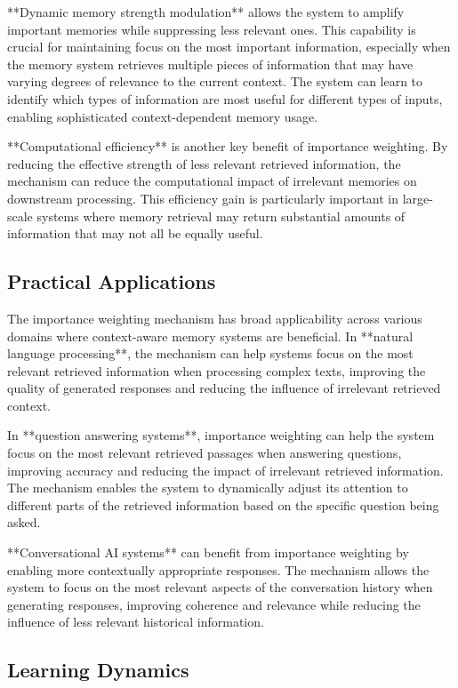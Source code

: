 \documentclass{article}
\begin{document}
**Dynamic memory strength modulation** allows the system to amplify important memories while suppressing less relevant ones. This capability is crucial for maintaining focus on the most important information, especially when the memory system retrieves multiple pieces of information that may have varying degrees of relevance to the current context. The system can learn to identify which types of information are most useful for different types of inputs, enabling sophisticated context-dependent memory usage.

**Computational efficiency** is another key benefit of importance weighting. By reducing the effective strength of less relevant retrieved information, the mechanism can reduce the computational impact of irrelevant memories on downstream processing. This efficiency gain is particularly important in large-scale systems where memory retrieval may return substantial amounts of information that may not all be equally useful.

\subsection{Practical Applications}

The importance weighting mechanism has broad applicability across various domains where context-aware memory systems are beneficial. In **natural language processing**, the mechanism can help systems focus on the most relevant retrieved information when processing complex texts, improving the quality of generated responses and reducing the influence of irrelevant retrieved context.

In **question answering systems**, importance weighting can help the system focus on the most relevant retrieved passages when answering questions, improving accuracy and reducing the impact of irrelevant retrieved information. The mechanism enables the system to dynamically adjust its attention to different parts of the retrieved information based on the specific question being asked.

**Conversational AI systems** can benefit from importance weighting by enabling more contextually appropriate responses. The mechanism allows the system to focus on the most relevant aspects of the conversation history when generating responses, improving coherence and relevance while reducing the influence of less relevant historical information.

\subsection{Learning Dynamics}
\end{document}
